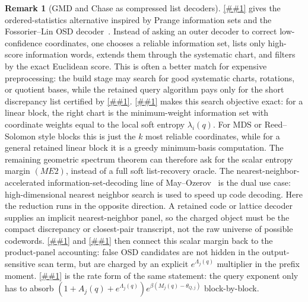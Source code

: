 \documentclass[10pt]{article}
\newcommand{\cref}[1]{\ref{##1}}
\newcommand{\Cref}[1]{\ref{##1}}
\theoremstyle{definition}
\newtheorem{remark}[theorem]{Remark}
\begin{document}
\begin{remark}[GMD and Chase as compressed list decoders]
   \Cref{lem:information-set-threshold-reporter} gives the ordered-statistics
   alternative inspired by Prange information sets and the Fossorier--Lin OSD
   decoder~\cite{Pra62,FL95}.  Instead of asking an outer decoder to correct
   low-confidence coordinates, one chooses a reliable information set, lists
   only high-score information words, extends them through the systematic chart,
   and filters by the exact Euclidean score.  This is often a better match for
   expensive preprocessing: the build stage may search for good systematic
   charts, rotations, or quotient bases, while the retained query algorithm pays
   only for the short discrepancy list certified by
   \cref{cor:ordered-statistics-information-set}.
   \Cref{lem:min-entropy-information-set} makes this search objective exact:
   for a linear block, the right chart is the minimum-weight information set
   with coordinate weights equal to the local soft entropy
   \(\lambda_i(q)\).  For MDS or Reed--Solomon style blocks this is just the
   \(k\) most reliable coordinates, while for a general retained linear block
   it is a greedy minimum-basis computation.  The remaining geometric spectrum
   theorem can therefore ask for the scalar entropy margin \((ME2)\), instead
   of a full soft list-recovery oracle.
   The nearest-neighbor-accelerated information-set-decoding line of
   May--Ozerov~\cite{MO15} is the dual use case: high-dimensional nearest
   neighbor search is used to speed up code decoding.  Here the reduction runs
   in the opposite direction.  A retained code or lattice decoder supplies an
   implicit nearest-neighbor panel, so the charged object must be the compact
   discrepancy or closest-pair transcript, not the raw universe of possible
   codewords.
   \Cref{lem:superset-product-panel-decoder} and
   \cref{cor:osd-superset-block-reporter} then connect this scalar margin back
   to the product-panel accounting: false OSD candidates are not hidden in the
   output-sensitive scan term, but are charged by an explicit
   \(e^{\Lambda_j(q)}\) multiplier in the prefix moment.
   \Cref{cor:superset-product-panel-rate-bookkeeping} is the rate form of the
   same statement: the query exponent only has to absorb
   \((1+A_j(q)+e^{\Lambda_j(q)})
   e^{\beta(M_j(q)-\theta_{Q,j})}\) block-by-block.
\end{remark}
\end{document}
